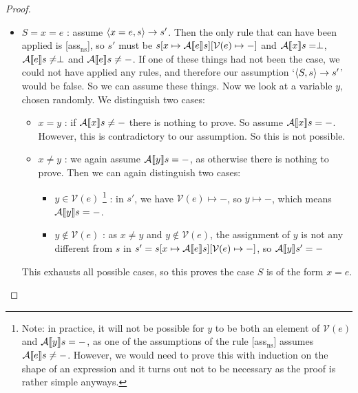 \begin{proof}
\begin{itemize}[noitemsep]
    \item $S = x = e$ : assume $\langle x = e, s \rangle \to s'$. Then the only rule that can have been applied is [ass$_{\textrm{ns}}$], so  $s'$ must be $s[x \mapsto \mathcal{A} \llbracket e \rrbracket s][\mathcal{V}(e)\mapsto-]$ and $\mathcal{A} \llbracket x \rrbracket s = \perp$, $\mathcal{A} \llbracket e \rrbracket s \neq \perp$ and $\mathcal{A} \llbracket e \rrbracket s \neq -$. If one of these things had not been the case, we could not have applied any rules, and therefore our assumption `$\langle S, s \rangle \to s'$' would be false. So we can assume these things. Now we look at a variable $y$, chosen randomly. We distinguish two cases:
    \begin{itemize}
        \item $x=y$ : if $\mathcal{A} \llbracket x \rrbracket s \not = -$ there is nothing to prove. So assume $\mathcal{A} \llbracket x \rrbracket s = -$. However, this is contradictory to our assumption. So this is not possible.
        \item $x\not = y$ : we again assume $\mathcal{A} \llbracket y \rrbracket s = -$, as otherwise there is nothing to prove. Then we can again distinguish two cases: 
        \begin{itemize}
            \item $y \in \mathcal{V}(e)$ \footnote{Note: in practice, it will not be possible for $y$ to be both an element of $\mathcal{V}(e)$ and $\mathcal{A} \llbracket y \rrbracket s = -$, as one of the assumptions of the rule [ass$_{\textrm{ns}}$] assumes $\mathcal{A} \llbracket e \rrbracket s \neq -$. However, we would need to prove this with induction on the shape of an expression and it turns out not to be necessary as the proof is rather simple anyways.} : in $s'$, we have $\mathcal{V}(e)\mapsto-$, so $y \mapsto -$, which means $\mathcal{A} \llbracket y \rrbracket s = -$.
            \item $y \not \in \mathcal{V}(e)$ : as $x \not = y$ and $y \not \in \mathcal{V}(e)$, the assignment of $y$ is not any different from $s$ in $s'=s[x \mapsto \mathcal{A} \llbracket e \rrbracket s][\mathcal{V}(e)\mapsto-]$, so $\mathcal{A} \llbracket y \rrbracket s' = -$
        \end{itemize}
    \end{itemize}
    This exhausts all possible cases, so this proves the case $S$ is of the form $x = e$.
    

\end{itemize}
\end{proof}
